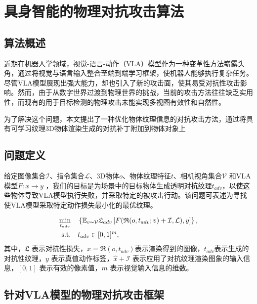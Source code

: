 \section{具身智能的物理对抗攻击算法}
\subsection{算法概述}
近期在机器人学领域，视觉-语言-动作（VLA）模型作为一种变革性方法崭露头角，通过将视觉与语言输入整合至端到端学习框架，使机器人能够执行复杂任务。尽管VLA模型展现出强大能力，却也引入了新的攻击面，使其易受对抗性攻击影响。然而，由于从数字世界过渡到物理世界的挑战，当前的攻击方法往往缺乏实用性，而现有的用于目标检测的物理攻击未能实现多视图有效性和自然性。

为了解决这个问题，本文提出了一种优化物体纹理信息的对抗攻击方法，通过将具有可学习纹理3D物体渲染生成的对抗补丁附加到物体对象上
\subsection{问题定义}

给定图像集合$\mathcal{I} $、指令集合$\mathcal{L} $、3D物体$o$、物体纹理特征$t$、相机视角集合$\mathcal{V}$ 和VLA模型$F: x\rightarrow  y$ ，我们的目标是为场景中的目标物体生成透明对抗纹理$t_{adv}$，以使这些物体导致VLA模型执行失败，并采取特定的被攻击行动。该问题可表述为寻找使VLA模型采取特定动作损失最小化的最优纹理。

\begin{equation}
    \begin{aligned}
    \min_{t_{adv}} &\quad \left\{\mathbb{E}_{v \thicksim  \mathcal{V} } \mathfrak{L} _{adv}\left[ F (\mathfrak{R}  (o, t_{adv}; v )+\mathcal{I}, \mathcal{L} ), y \right ] \right\},\\
    \mathrm{s.t.} &\quad t_{adv} \in [0,1]^m,
    \end{aligned}
\end{equation}
其中，$\mathfrak{L}$ 表示对抗性损失，$\hat {x}=\mathfrak{R} (o, t_{adv})$表示渲染得到的图像，$t_{adv}$表示生成的对抗性纹理，$y$ 表示真值动作标签，$\hat{x}+\mathcal{I}$ 表示应用了对抗纹理渲染图象的输入信息，$[0,1]$ 表示有效的像素值，$m$ 表示视觉输入信息的维数。

\subsection{针对VLA模型的物理对抗攻击框架}

\subsubsection{}